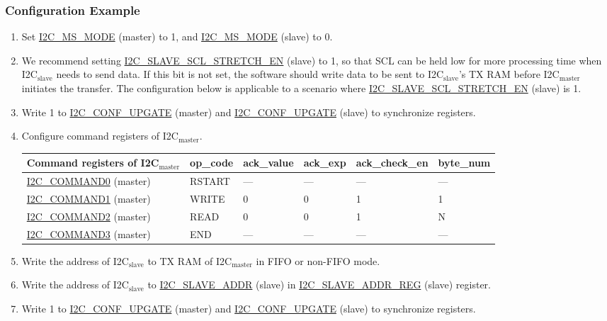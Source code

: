 \documentclass[main\_\_EN.tex]{subfiles}
\begin{document}
\subsubsection{Configuration Example}
\begin{enumerate}
\item Set \hyperref[fielddesc:I2CMSMODE]{I2C\_MS\_MODE} (master) to 1, and \hyperref[fielddesc:I2CMSMODE]{I2C\_MS\_MODE} (slave) to 0.
\item We recommend setting \hyperref[fielddesc:I2CSLAVESCLSTRETCHEN]{I2C\_SLAVE\_SCL\_STRETCH\_EN} (slave) to 1, so that SCL can be held low for more processing time when I2C$_\text{slave}$ needs to send data. If this bit is not set, the software should write data to be sent to I2C$_\text{slave}$'s TX RAM before I2C$_\text{master}$ initiates the transfer. The configuration below is applicable to a scenario where \hyperref[fielddesc:I2CSLAVESCLSTRETCHEN]{I2C\_SLAVE\_SCL\_STRETCH\_EN} (slave) is 1.
\item Write 1 to \hyperref[fielddesc:I2CCONFUPGATE]{I2C\_CONF\_UPGATE} (master) and \hyperref[fielddesc:I2CCONFUPGATE]{I2C\_CONF\_UPGATE} (slave) to synchronize registers.
\item Configure command registers of I2C$_\text{master}$.
\begin{longtable}{ | p{4cm} | p{2cm} | p{2cm} | p{2cm} |p{2cm} | p{2cm} |}
\hline\rowcolor{lightgray}
Command registers of I2C$_\text{master}$& op\_code & ack\_value&ack\_exp&ack\_check\_en&byte\_num  \\ \hline
\hyperref[fielddesc:I2CCOMMAND0]{I2C\_COMMAND0} (master)& RSTART& ---&---&---&---  \\ \hline
\hyperref[fielddesc:I2CCOMMAND1]{I2C\_COMMAND1} (master)& WRITE& 0&0&1&1  \\ \hline
\hyperref[fielddesc:I2CCOMMAND2]{I2C\_COMMAND2} (master)& READ& 0&0&1&N  \\ \hline
\hyperref[fielddesc:I2CCOMMAND3]{I2C\_COMMAND3} (master)& END& ---&---&---&---  \\ \hline
\end{longtable}
\item Write the address of I2C$_\text{slave}$ to TX RAM of I2C$_\text{master}$ in FIFO or non-FIFO mode.
\item Write the address of I2C$_\text{slave}$ to \hyperref[fielddesc:I2CSLAVEADDR]{I2C\_SLAVE\_ADDR} (slave) in \hyperref[regdesc:I2CSLAVEADDRREG]{I2C\_SLAVE\_ADDR\_REG} (slave) register.
\item Write 1 to \hyperref[fielddesc:I2CCONFUPGATE]{I2C\_CONF\_UPGATE} (master) and \hyperref[fielddesc:I2CCONFUPGATE]{I2C\_CONF\_UPGATE} (slave) to synchronize registers.

\end{enumerate}
\end{document}
